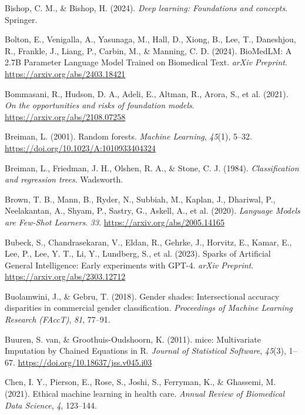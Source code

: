 \documentclass[
  letterpaper,
  11pt]{scrbook}
\newlength{\cslhangindent}
\newenvironment{CSLReferences}[2] %
 {\begin{list}{}{%
  \setlength{\itemindent}{0pt}
  \setlength{\leftmargin}{0pt}
  \setlength{\parsep}{0pt}
  \ifodd #1
   \setlength{\leftmargin}{\cslhangindent}
   \setlength{\itemindent}{-1\cslhangindent}
  \fi
  \setlength{\itemsep}{#2\baselineskip}}}
 {\end{list}}
\begin{document}
\begin{CSLReferences}{1}{0}
Bishop, C. M., \& Bishop, H. (2024). \emph{Deep learning: Foundations
and concepts}. Springer.

Bolton, E., Venigalla, A., Yasunaga, M., Hall, D., Xiong, B., Lee, T.,
Daneshjou, R., Frankle, J., Liang, P., Carbin, M., \& Manning, C. D.
(2024). {BioMedLM}: {A 2.7B Parameter Language Model Trained on
Biomedical Text}. \emph{arXiv Preprint}.
\url{https://arxiv.org/abs/2403.18421}

{Bommasani, R., Hudson, D. A., Adeli, E., Altman, R., Arora, S., et al.}
(2021). \emph{On the opportunities and risks of foundation models}.
\url{https://arxiv.org/abs/2108.07258}

Breiman, L. (2001). Random forests. \emph{Machine Learning},
\emph{45}(1), 5--32. \url{https://doi.org/10.1023/A:1010933404324}

Breiman, L., Friedman, J. H., Olshen, R. A., \& Stone, C. J. (1984).
\emph{Classification and regression trees}. Wadsworth.

{Brown, T. B., Mann, B., Ryder, N., Subbiah, M., Kaplan, J., Dhariwal,
P., Neelakantan, A., Shyam, P., Sastry, G., Askell, A., et al.} (2020).
\emph{{Language Models are Few-Shot Learners}}. \emph{33}.
\url{https://arxiv.org/abs/2005.14165}

{Bubeck, S., Chandrasekaran, V., Eldan, R., Gehrke, J., Horvitz, E.,
Kamar, E., Lee, P., Lee, Y. T., Li, Y., Lundberg, S., et al.} (2023).
{Sparks of Artificial General Intelligence}: {Early experiments with
GPT-4}. \emph{arXiv Preprint}. \url{https://arxiv.org/abs/2303.12712}

Buolamwini, J., \& Gebru, T. (2018). Gender shades: Intersectional
accuracy disparities in commercial gender classification.
\emph{Proceedings of Machine Learning Research (FAccT)}, \emph{81},
77--91.

Buuren, S. van, \& Groothuis-Oudshoorn, K. (2011). {mice}: {Multivariate
Imputation by Chained Equations in R}. \emph{Journal of Statistical
Software}, \emph{45}(3), 1--67.
\url{https://doi.org/10.18637/jss.v045.i03}

Chen, I. Y., Pierson, E., Rose, S., Joshi, S., Ferryman, K., \&
Ghassemi, M. (2021). Ethical machine learning in health care.
\emph{Annual Review of Biomedical Data Science}, \emph{4}, 123--144.


\end{CSLReferences}
\end{document}
